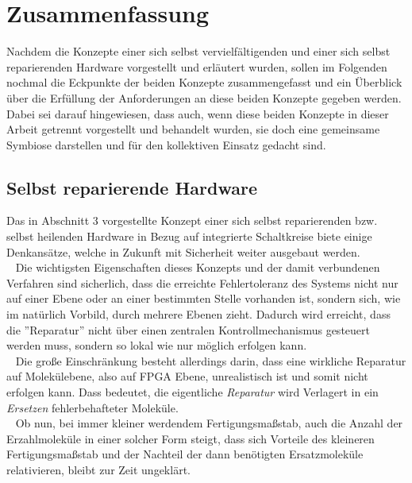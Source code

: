 \documentclass[12p, a4]{article}
\begin{document}
\section{Zusammenfassung}
Nachdem die Konzepte einer sich selbst vervielfältigenden und einer sich
selbst reparierenden Hardware vorgestellt und erläutert wurden, sollen im
Folgenden nochmal die Eckpunkte der beiden Konzepte zusammengefasst und
ein Überblick über die Erfüllung der Anforderungen an diese beiden Konzepte
gegeben werden. Dabei sei darauf hingewiesen, dass auch, wenn diese beiden
Konzepte in dieser Arbeit getrennt vorgestellt und behandelt wurden, sie
doch eine gemeinsame Symbiose darstellen und für den kollektiven Einsatz
gedacht sind.\\


\subsection{Selbst reparierende Hardware}
Das in Abschnitt 3 vorgestellte Konzept einer sich selbst reparierenden bzw.
selbst heilenden Hardware in Bezug auf integrierte Schaltkreise biete einige
Denkansätze, welche in Zukunft mit Sicherheit weiter ausgebaut werden.\\
\ \newline
Die wichtigsten Eigenschaften dieses Konzepts und der damit verbundenen
Verfahren sind sicherlich, dass die erreichte Fehlertoleranz des Systems
nicht nur auf einer Ebene oder an einer bestimmten Stelle vorhanden ist,
sondern sich, wie im natürlich Vorbild, durch mehrere Ebenen zieht.
Dadurch wird erreicht, dass die ''Reparatur'' nicht über einen zentralen
Kontrollmechanismus gesteuert werden muss, sondern so lokal wie nur möglich
erfolgen kann.\\
\ \newline
Die große Einschränkung besteht allerdings darin, dass eine wirkliche
Reparatur auf Molekülebene, also auf FPGA Ebene, unrealistisch ist und somit
nicht erfolgen kann. Dass bedeutet, die eigentliche \textit{Reparatur} wird
Verlagert in ein \textit{Ersetzen} fehlerbehafteter Moleküle.\\
\ \newline
Ob nun, bei immer kleiner werdendem Fertigungsmaßstab, auch die Anzahl der
Erzahlmoleküle in einer solcher Form steigt, dass sich Vorteile des
kleineren Fertigungsmaßstab und der Nachteil der dann benötigten
Ersatzmoleküle relativieren, bleibt zur Zeit ungeklärt.
\end{document}
